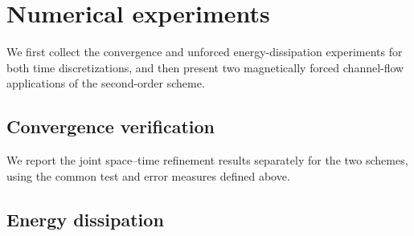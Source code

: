 \section{Numerical experiments}
\label{sec:numerical-experiments}
We first collect the convergence and unforced energy-dissipation
experiments for both time discretizations, and then present two
magnetically forced channel-flow applications of the second-order scheme.



\subsection{Convergence verification}
\label{subsec:convergence-verification}
We report the joint space--time refinement results separately for the
two schemes, using the common test and error measures defined above.



\subsection{Energy dissipation}
\label{subsec:energy-dissipation}



\FloatBarrier



